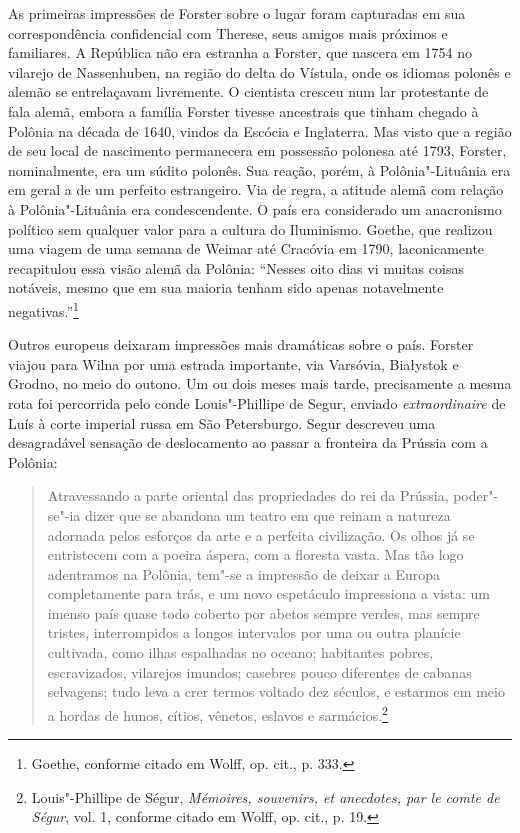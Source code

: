 As primeiras impressões de Forster sobre o lugar foram capturadas em sua
correspondência confidencial com Therese, seus amigos mais próximos e
familiares. A República não era estranha a Forster, que nascera em 1754
no vilarejo de Nassenhuben, na região do delta do Vístula, onde os
idiomas polonês e alemão se entrelaçavam livremente. O cientista cresceu
num lar protestante de fala alemã, embora a família Forster tivesse
ancestrais que tinham chegado à Polônia na década de 1640, vindos da
Escócia e Inglaterra. Mas visto que a região de seu local de nascimento
permanecera em possessão polonesa até 1793, Forster, nominalmente, era
um súdito polonês. Sua reação, porém, à Polônia"-Lituânia era em geral a
de um perfeito estrangeiro. Via de regra, a atitude alemã com relação à
Polônia"-Lituânia era condescendente. O país era considerado um
anacronismo político sem qualquer valor para a cultura do Iluminismo.
Goethe, que realizou uma viagem de uma semana de Weimar até Cracóvia em
1790, laconicamente recapitulou essa visão alemã da Polônia: ``Nesses
oito dias vi muitas coisas notáveis, mesmo que em sua maioria tenham
sido apenas notavelmente negativas.''\footnote{Goethe, conforme citado
  em Wolff, op. cit., p. 333.}

Outros europeus deixaram impressões mais dramáticas sobre o país.
Forster viajou para Wilna por uma estrada importante, via Varsóvia,
Białystok e Grodno, no meio do outono. Um ou dois meses mais tarde,
precisamente a mesma rota foi percorrida pelo conde Louis"-Phillipe de
Segur, enviado \emph{extraordinaire} de Luís  à corte imperial russa
em São Petersburgo. Segur descreveu uma desagradável sensação de
deslocamento ao passar a fronteira da Prússia com a Polônia:

\begin{quote}
Atravessando a parte oriental das propriedades do rei da Prússia,
poder"-se"-ia dizer que se abandona um teatro em que reinam a natureza
adornada pelos esforços da arte e a perfeita civilização. Os olhos já se
entristecem com a poeira áspera, com a floresta vasta. Mas tão logo
adentramos na Polônia, tem"-se a impressão de deixar a Europa
completamente para trás, e um novo espetáculo impressiona a vista: um
imenso país quase todo coberto por abetos sempre verdes, mas sempre
tristes, interrompidos a longos intervalos por uma ou outra planície
cultivada, como ilhas espalhadas no oceano; habitantes pobres,
escravizados, vilarejos imundos; casebres pouco diferentes de cabanas
selvagens; tudo leva a crer termos voltado dez séculos, e estarmos em
meio a hordas de hunos, cítios, vênetos, eslavos e sarmácios.\footnote{Louis"-Phillipe
  de Ségur, \emph{Mémoires, souvenirs, et anecdotes, par le comte de
  Ségur}, vol. 1, conforme citado em Wolff, op. cit., p. 19.}
\end{quote}


